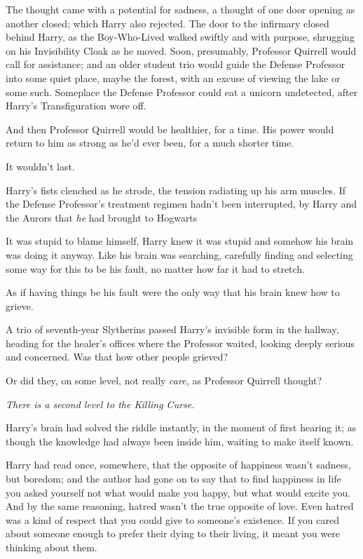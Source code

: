 The thought came with a potential for sadness, a thought of one door opening as
another closed; which Harry also rejected.
\sbreak
The door to the infirmary closed behind Harry, as the Boy-Who-Lived walked
swiftly and with purpose, shrugging on his Invisibility Cloak as he moved.
Soon, presumably, Professor Quirrell would call for assistance; and an older
student trio would guide the Defense Professor into some quiet place, maybe the
forest, with an excuse of viewing the lake or some such. Someplace the Defense
Professor could eat a unicorn undetected, after Harry's Transfiguration wore
off.

And then Professor Quirrell would be healthier, for a time. His power would
return to him as strong as he'd ever been, for a much shorter time.

It wouldn't last.

Harry's fists clenched as he strode, the tension radiating up his arm muscles.
If the Defense Professor's treatment regimen hadn't been interrupted, by Harry
and the Aurors that \emph{he} had brought to Hogwarts{\el}

It was stupid to blame himself, Harry knew it was stupid and somehow his brain
was doing it anyway. Like his brain was searching, carefully finding and
selecting some way for this to be his fault, no matter how far it had to
stretch.

As if having things be his fault were the only way that his brain knew how to
grieve.

A trio of seventh-year Slytherins passed Harry's invisible form in the hallway,
heading for the healer's offices where the Professor waited, looking deeply
serious and concerned. Was that how other people grieved?

Or did they, on some level, not really \emph{care,} as Professor Quirrell
thought?

\emph{There is a second level to the Killing Curse.}

Harry's brain had solved the riddle instantly, in the moment of first hearing
it; as though the knowledge had always been inside him, waiting to make itself
known.

Harry had read once, somewhere, that the opposite of happiness wasn't sadness,
but boredom; and the author had gone on to say that to find happiness in life
you asked yourself not what would make you happy, but what would excite you.
And by the same reasoning, hatred wasn't the true opposite of love. Even hatred
was a kind of respect that you could give to someone's existence. If you cared
about someone enough to prefer their dying to their living, it meant you were
thinking about them.


